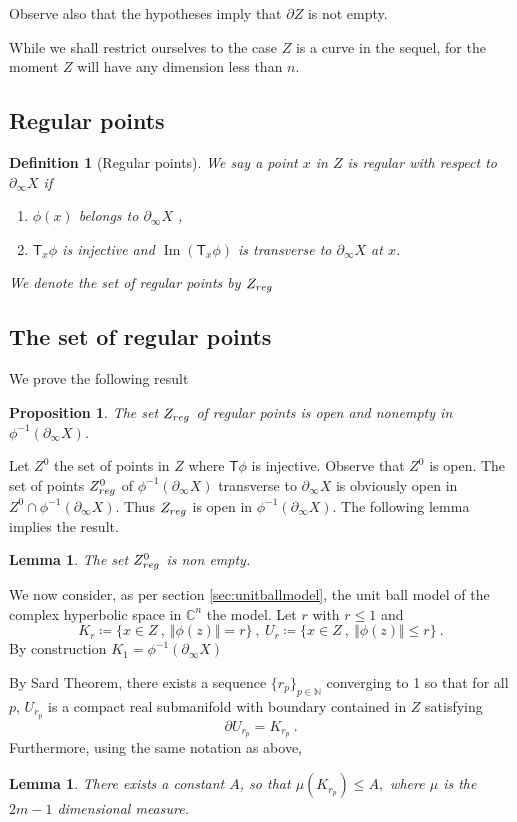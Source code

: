 \documentclass[12pt,reqno]{amsart}
\newtheorem{lemma}[theorem]{Lemma}
\newtheorem{proposition}[theorem]{Proposition}
\newtheorem{definition}[theorem]{Definition}
\newcommand{\T}{\ms T}
\renewcommand{\leq}{\leqslant}
\newcommand{\ms}{\mathsf}
\newcommand{\defeq}{\coloneqq}
\newcommand{\bX}{\partial_\infty X}
\newcommand{\im}{\operatorname{Im}}
\newcommand{\Zreg}{Z_{\tiny{reg}}}
\newcommand{\seq}[1]{ \{{#1}_p\}_{p\in\mathbb N}}
\begin{document}
Observe also that the hypotheses imply  that $\partial Z$ is not empty.

While we shall restrict ourselves to the case $Z$ is a curve in the sequel, for the moment $Z$ will have any dimension less than $n$.


\subsection{Regular points}


\begin{definition}[\sc Regular points]

We say a point $x$ in $Z$ is {\em regular with respect to $\partial_\infty X$}  if 
\begin{enumerate}
	\item $\phi(x)$ belongs to $\partial_\infty X$ ,
	\item $\T_x\phi$ is injective and $\im(\T_x\phi)$ is transverse to $\bX$ at $x$.
\end{enumerate}
We denote the set of regular points by $\Zreg$
\end{definition}

\subsection{The set of regular points}
We prove the following result
\begin{proposition}\label{pro:reg} The set $\Zreg$ of regular points is open and nonempty in $\phi^{-1}(\partial_\infty X)$.
\end{proposition}

Let $Z^0$ the set of points in $Z$ where $\T\phi$ is injective. Observe that $Z^0$ is open. The set of points $\Zreg^0$ of $ \phi^{-1}(\bX)$ transverse to $\bX$ is obviously open in $Z^0\cap \phi^{-1}(\bX)$. Thus $\Zreg$ is open  in $\phi^{-1}(\bX)$.  The following lemma implies the result.

\begin{lemma}\label{lem:non-empty1}
The set $\Zreg^0$ is non empty.
\end{lemma}
We now consider, as per  section \ref{sec:unitballmodel}, the unit ball model of the complex hyperbolic space in $\mathbb C^n$ the model. Let $r$ with $r\leq 1$ and 
$$K_r\defeq\{x\in Z\ ,\  \Vert \phi(z)\Vert=r\}\ ,\ U_r\defeq \{x\in Z\ ,\  \Vert \phi(z)\Vert \le r\}\ .$$
By construction $K_1=\phi^{-1}(\bX)$

By Sard Theorem, there exists a sequence $\seq{r}$ converging to 1 so that for all $p$,
$U_{r_p}$ is a 	compact real submanifold  with boundary contained in $Z$   satisfying 
$$
\partial U_{r_p}=K_{r_p}\ .
$$
Furthermore, using the same notation as above, 
\begin{lemma}\label{lem:2n-3}
There exists a constant $A$, so that 
$\mu(K_{r_p})\leq A , $	
where  $\mu$ is the $2m-1$ dimensional measure.
\end{lemma}
\end{document}
